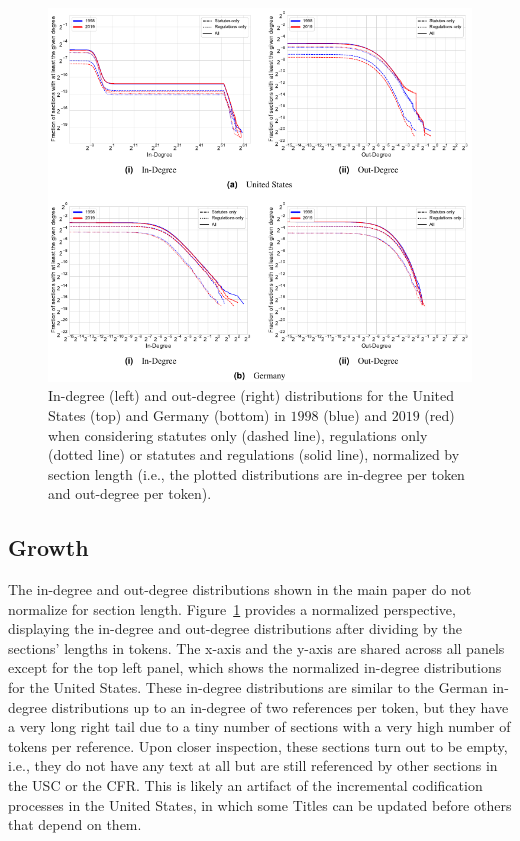 \documentclass[utf8,sort&compress,numbers,square,table,hidelinks]{frontiers_suppmat} %
\begin{document}
\begin{figure}
	\centering
	\includegraphics[width=\textwidth]{figure_si_normalized_growth}
	\caption{In-degree (left) and out-degree (right) distributions for the United States (top) and Germany (bottom) in $1998$ (blue) and $2019$ (red) when considering statutes only (dashed line), regulations only (dotted line) or statutes and regulations (solid line), normalized by section length (i.e., the plotted distributions are in-degree per token and out-degree per token).}\label{fig:growth-normalized}
\end{figure}

\vspace*{12pt}
\subsection{Growth}

The in-degree and out-degree distributions shown in the main paper do not normalize for section length.
Figure~\ref{fig:growth-normalized} provides a normalized perspective, displaying the in-degree and out-degree distributions after dividing by the sections' lengths in tokens.
The x-axis and the y-axis are shared across all panels except for the top left panel, which shows the normalized in-degree distributions for the United States.
These in-degree distributions are similar to the German in-degree distributions up to an in-degree of two references per token,
but they have a very long right tail due to a tiny number of sections with a very high number of tokens per reference.
Upon closer inspection, these sections turn out to be empty, i.e., they do not have any text at all but are still referenced by other sections in the USC or the CFR.
This is likely an artifact of the incremental codification processes in the United States, in which some Titles can be updated before others that depend on them.
\end{document}
